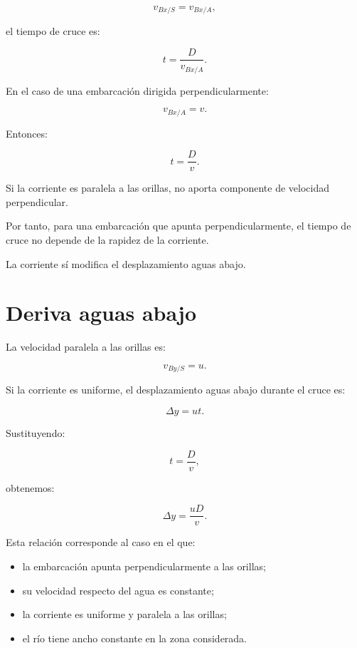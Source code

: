 \[
v_{Bx/S}=v_{Bx/A},
\]

el tiempo de cruce es:

\[
\boxed{
t=\frac{D}{v_{Bx/A}}
}.
\]

En el caso de una embarcación dirigida
perpendicularmente:

\[
v_{Bx/A}=v.
\]

Entonces:

\[
\boxed{
t=\frac{D}{v}
}.
\]

\begin{interpretacion}

Si la corriente es paralela a las orillas,
no aporta componente de velocidad perpendicular.

Por tanto, para una embarcación que apunta
perpendicularmente, el tiempo de cruce
no depende de la rapidez de la corriente.

La corriente sí modifica el desplazamiento
aguas abajo.

\end{interpretacion}


\section{Deriva aguas abajo}

La velocidad paralela a las orillas es:

\[
v_{By/S}=u.
\]

Si la corriente es uniforme, el desplazamiento
aguas abajo durante el cruce es:

\[
\Delta y=ut.
\]

Sustituyendo:

\[
t=\frac{D}{v},
\]

obtenemos:

\[
\boxed{
\Delta y=\frac{uD}{v}
}.
\]

\begin{condicion}

Esta relación corresponde al caso en el que:

\begin{itemize}
    \item la embarcación apunta perpendicularmente a las orillas;
    \item su velocidad respecto del agua es constante;
    \item la corriente es uniforme y paralela a las orillas;
    \item el río tiene ancho constante en la zona considerada.
\end{itemize}

\end{condicion}


